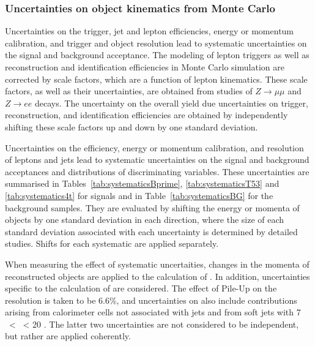 \subsubsection{Uncertainties on object kinematics from Monte Carlo}
Uncertainties on the trigger, jet and lepton efficiencies, energy or momentum calibration,
and trigger and object resolution lead to systematic uncertainties on the signal and background acceptance.
The modeling of lepton triggers as well as reconstruction and identification efficiencies in
Monte Carlo simulation are corrected by scale factors, which are a function of lepton kinematics.
These scale factors, as well as their uncertainties, are obtained from studies of $Z \rightarrow \mu \mu$ and $Z \rightarrow e e$ decays.
The uncertainty on the overall yield due uncertainties on trigger, reconstruction, and identification efficiencies
are obtained by independently shifting these scale factors up and down by one standard deviation.

Uncertainties on the efficiency, energy or momentum calibration, and resolution of leptons and jets
lead to systematic uncertainties on the signal and background acceptances and distributions of discriminating variables.
These uncertainties are summarised in Tables~\ref{tab:systematicsBprime}, \ref{tab:systematicsT53} and
\ref{tab:systematics4t} for signals and in Table~\ref{tab:systematicsBG} for the background samples.
They are evaluated by shifting the energy or momenta of objects by one standard deviation in each direction,
where the size of each standard deviation associated with each uncertainty is determined by detailed studies.
Shifts for each systematic are applied separately.

When measuring the effect of systematic uncertaities, changes in the momenta of reconstructed objects are applied to the calculation of \met{}.
In addition, uncertainties specific to the calculation of \met{} are considered.
The effect of Pile-Up on the \met{} resolution is taken to be 6.6\%,
and uncertainties on \met{} also include contributions arising from calorimeter cells not associated with jets and from soft jets with 7 \GeV\ < \pt\ < 20 \GeV{}.
The latter two uncertainties are not considered to be independent, but rather are applied coherently.

